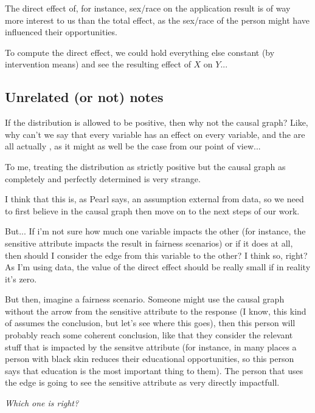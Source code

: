 The direct effect of, for instance, sex/race on the application result is of way more interest to us than the total effect, as the sex/race of the person might have influenced their opportunities.

To compute the direct effect, we could hold everything else constant (by intervention means) and see the resulting effect of $X$ on $Y$...





\subsection{Unrelated (or not) notes}

If the distribution is allowed to be positive, then why not the causal graph? Like, why can't we say that every variable has an effect on every variable, and the  are all actually , as it might as well be the case from our point of view...

To me, treating the distribution as strictly positive but the causal graph as completely and perfectly determined is very strange.

I think that this is, as Pearl says, an assumption external from data, so we need to first believe in the causal graph then move on to the next steps of our work.

But... If i'm not sure how much one variable impacts the other (for instance, the sensitive attribute impacts the result in fairness scenarios) or if it does at all, then should I consider the edge from this variable to the other? I think so, right? As I'm using data, the value of the direct effect should be really small if in reality it's zero.

But then, imagine a fairness scenario. Someone might use the causal graph without the arrow from the sensitive attribute to the response (I know, this kind of assumes the conclusion, but let's see where this goes), then this person will probably reach some coherent conclusion, like that they consider the relevant stuff that is impacted by the sensitve attribute (for instance, in many places a person with black skin reduces their educational opportunities, so this person says that education is the most important thing to them). The person that uses the edge is going to see the sensitive attribute as very directly impactfull.

\textit{Which one is right?}

